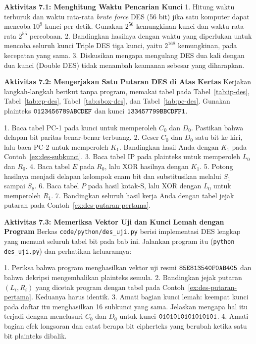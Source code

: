 
\begin{obeactivity}
\textbf{Aktivitas 7.1: Menghitung Waktu Pencarian Kunci}
1. Hitung waktu terburuk dan waktu rata-rata \textit{brute force} DES (56 bit)
   jika satu komputer dapat mencoba $10^9$ kunci per detik. Gunakan $2^{56}$
   kemungkinan kunci dan waktu rata-rata $2^{55}$ percobaan.
2. Bandingkan hasilnya dengan waktu yang diperlukan untuk mencoba seluruh kunci
   Triple DES tiga kunci, yaitu $2^{168}$ kemungkinan, pada kecepatan yang sama.
3. Diskusikan mengapa mengulang DES dua kali dengan dua kunci (Double DES) tidak
   menambah keamanan sebesar yang diharapkan.
\end{obeactivity}

\begin{obeactivity}
\textbf{Aktivitas 7.2: Mengerjakan Satu Putaran DES di Atas Kertas}
Kerjakan langkah-langkah berikut tanpa program, memakai tabel pada
Tabel~\ref{tab:ip-des}, Tabel~\ref{tab:ep-des}, Tabel~\ref{tab:sbox-des}, dan
Tabel~\ref{tab:pc-des}. Gunakan plainteks $\texttt{0123456789ABCDEF}$ dan kunci
$\texttt{133457799BBCDFF1}$.

1. Baca tabel PC-1 pada kunci untuk memperoleh $C_0$ dan $D_0$. Pastikan bahwa
   delapan bit paritas benar-benar terbuang.
2. Geser $C_0$ dan $D_0$ satu bit ke kiri, lalu baca PC-2 untuk memperoleh $K_1$.
   Bandingkan hasil Anda dengan $K_1$ pada Contoh~\ref{ex:des-subkunci}.
3. Baca tabel IP pada plainteks untuk memperoleh $L_0$ dan $R_0$.
4. Baca tabel $E$ pada $R_0$, lalu XOR hasilnya dengan $K_1$.
5. Potong hasilnya menjadi delapan kelompok enam bit dan substitusikan melalui
   $S_1$ sampai $S_8$.
6. Baca tabel $P$ pada hasil kotak-S, lalu XOR dengan $L_0$ untuk memperoleh
   $R_1$.
7. Bandingkan seluruh hasil kerja Anda dengan tabel jejak putaran pada
   Contoh~\ref{ex:des-putaran-pertama}.
\end{obeactivity}

\begin{obeactivity}
\textbf{Aktivitas 7.3: Memeriksa Vektor Uji dan Kunci Lemah dengan Program}
Berkas \texttt{code/python/des\_uji.py} berisi implementasi DES lengkap yang
memuat seluruh tabel bit pada bab ini. Jalankan program itu
(\texttt{python des\_uji.py}) dan perhatikan keluarannya:

1. Periksa bahwa program menghasilkan vektor uji resmi
   $\texttt{85E813540F0AB405}$ dan bahwa dekripsi mengembalikan plainteks semula.
2. Bandingkan jejak putaran $(L_i, R_i)$ yang dicetak program dengan tabel pada
   Contoh~\ref{ex:des-putaran-pertama}. Keduanya harus identik.
3. Amati bagian kunci lemah: keempat kunci pada daftar itu menghasilkan 16
   subkunci yang sama. Jelaskan mengapa hal itu terjadi dengan menelusuri
   $C_0$ dan $D_0$ untuk kunci $\texttt{0101010101010101}$.
4. Amati bagian efek longsoran dan catat berapa bit cipherteks yang berubah
   ketika satu bit plainteks dibalik.
\end{obeactivity}

